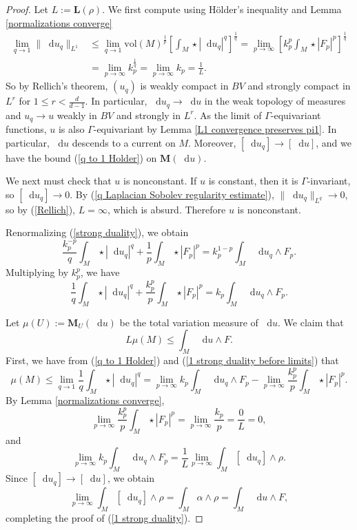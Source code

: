 \documentclass[reqno,11pt]{amsart}
\newcommand*\dif{\mathop{}\!\mathrm{d}}
\newcommand{\vol}{\mathrm{vol}}
\newcommand{\Mass}{\mathbf M}
\newcommand{\Comass}{\mathbf L}
\theoremstyle{definition}
\numberwithin{equation}{section}
\begin{document}
\begin{proof}
Let $L := \Comass(\rho)$.
We first compute using H\"older's inequality and Lemma \ref{normalizations converge}
\begin{align}
\lim_{q \to 1} \|\dif u_q\|_{L^1}
&\leq \lim_{q \to 1} \vol(M)^{\frac{1}{p}} \left[\int_M \star |\dif u_q|^q\right]^{\frac{1}{q}} = \lim_{p \to \infty} \left[k_p^p \int_M \star |F_p|^p\right]^{\frac{1}{q}} \label{Rellich}\\
&= \lim_{p \to \infty} k_p^{\frac{1}{q}} = \lim_{p \to \infty} k_p = \frac{1}{L} \nonumber.
\end{align}
So by Rellich's theorem, $(u_q)$ is weakly compact in $BV$ and strongly compact in $L^r$ for $1 \leq r < \frac{d}{d - 1}$.
In particular, $\dif u_q \to \dif u$ in the weak topology of measures and $u_q \to u$ weakly in $BV$ and strongly in $L^r$.
As the limit of $\Gamma$-equivariant functions, $u$ is also $\Gamma$-equivariant by Lemma \ref{L1 convergence preserves pi1}.
In particular, $\dif u$ descends to a current on $M$.
Moreover, $[\dif u_q] \to [\dif u]$, and we have the bound (\ref{q to 1 Holder}) on $\Mass(\dif u)$.

We next must check that $u$ is nonconstant.
If $u$ is constant, then it is $\Gamma$-invariant, so $[\dif u_q] \to 0$.
By (\ref{q Laplacian Sobolev regularity estimate}), $\|\dif u_q\|_{L^q} \to 0$, so by (\ref{Rellich}), $L = \infty$, which is absurd.
Therefore $u$ is nonconstant.

Renormalizing (\ref{strong duality}), we obtain 
$$\frac{k_p^{-p}}{q} \int_M \star |\dif u_q|^q + \frac{1}{p} \int_M \star |F_p|^p = k_p^{1 - p} \int_M \dif u_q \wedge F_p.$$
Multiplying by $k_p^p$, we have 
\begin{equation}\label{1 strong duality before limits}
	\frac{1}{q} \int_M \star |\dif u_q|^q + \frac{k_p^p}{p} \int_M \star |F_p|^p = k_p \int_M \dif u_q \wedge F_p.
\end{equation}

Let $\mu(U) := \Mass_U(\dif u)$ be the total variation measure of $\dif u$.
We claim that
\begin{equation}\label{1 strong duality}
	L\mu(M) \leq \int_M \dif u \wedge F.
\end{equation}
First, we have from (\ref{q to 1 Holder}) and (\ref{1 strong duality before limits}) that
$$\mu(M) \leq \lim_{q \to 1} \frac{1}{q} \int_M \star |\dif u_q|^q = \lim_{p \to \infty} k_p \int_M \dif u_q \wedge F_p - \lim_{p \to \infty} \frac{k_p^p}{p} \int_M \star |F_p|^p.$$
By Lemma \ref{normalizations converge},
$$\lim_{p \to \infty} \frac{k_p^p}{p} \int_M \star |F_p|^p = \lim_{p \to \infty} \frac{k_p}{p} = \frac{0}{L} = 0,$$
and
$$\lim_{p \to \infty} k_p \int_M \dif u_q \wedge F_p = \frac{1}{L} \lim_{p \to \infty} \int_M [\dif u_q] \wedge \rho.$$
Since $[\dif u_q] \to [\dif u]$, we obtain
$$\lim_{p \to \infty} \int_M [\dif u_q] \wedge \rho = \int_M \alpha \wedge \rho = \int_M \dif u \wedge F,$$
completing the proof of (\ref{1 strong duality}).


\end{proof}
\end{document}
